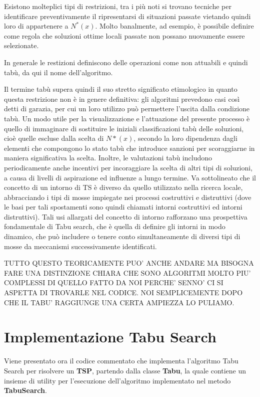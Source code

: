Esistono molteplici tipi di restrizioni, tra i più noti si trovano tecniche per identificare preventivamente il ripresentarsi di situazioni passate vietando quindi loro di appartenere a $N^*(x)$. Molto banalmente, ad esempio, è possibile definire come regola che soluzioni ottime locali passate non possano nuovamente essere selezionate.

In generale le restizioni definiscono delle operazioni come non attuabili e quindi tabù, da qui il nome dell'algoritmo.

Il termine tabù supera quindi il suo stretto significato etimologico in quanto questa restrizione non è in genere definitiva: gli algoritmi prevedono casi così detti di garazia, per cui un loro utilizzo può permettere l'uscita dalla condizione tabù. Un modo utile per la visualizzazione e l'attuazione del presente processo è quello di immaginare di sostituire le iniziali classificazioni tabù delle soluzioni, cioè quelle escluse dalla scelta di $N*(x)$, secondo la loro dipendenza dagli elementi che compongono lo stato tabù che introduce sanzioni per scoraggiarne in maniera significativa la scelta. Inoltre, le valutazioni tabù includono periodicamente anche incentivi per incoraggiare la scelta di altri tipi di soluzioni, a causa di livelli di aspirazione ed influenze a lungo termine. Va sottolineato che il concetto di un intorno di TS è diverso da quello utilizzato nella ricerca locale, abbracciando i tipi di mosse impiegate nei processi costruttivi e distruttivi (dove le basi per tali spostamenti sono quindi chiamati intorni costruttivi ed intorni distruttivi). Tali usi allargati del concetto di intorno rafforzano una prospettiva fondamentale di Tabu search, che è quella di definire gli intorni in modo dinamico, che può includere o tenere conto simultaneamente di diversi tipi di mosse da meccanismi successivamente identificati.

TUTTO QUESTO TEORICAMENTE PUO' ANCHE ANDARE MA BISOGNA FARE UNA DISTINZIONE CHIARA CHE SONO ALGORITMI MOLTO PIU' COMPLESSI DI QUELLO FATTO DA NOI PERCHE' SENNO' CI SI ASPETTA DI TROVARLE NEL CODICE. NOI SEMPLICEMENTE DOPO CHE IL TABU' RAGGIUNGE UNA CERTA AMPIEZZA LO PULIAMO.

\section{Implementazione Tabu Search}
Viene presentato ora il codice commentato che implementa l'algoritmo Tabu Search per risolvere un \textbf{TSP}, partendo dalla classe \textbf{Tabu}, la quale contiene un insieme di utility per l'esecuzione dell'algoritmo implementato nel metodo \textbf{TabuSearch}.

